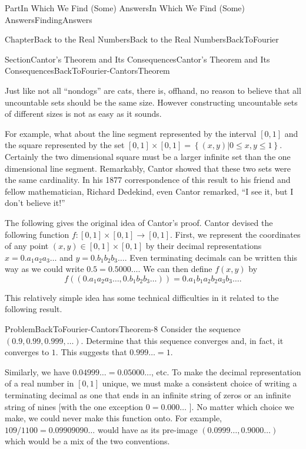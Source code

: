 \documentclass[oneside,10pt,]{book}
\numberwithin{equation}{part}
\begin{document}
\begin{partptx}{Part}{In Which We Find (Some) Answers}{}{In Which We Find (Some) Answers}{}{}{FindingAnswers}
\begin{chapterptx}{Chapter}{Back to the Real Numbers}{}{Back to the Real Numbers}{}{}{BackToFourier}
\begin{sectionptx}{Section}{Cantor's Theorem and Its Consequences}{}{Cantor's Theorem and Its Consequences}{}{}{BackToFourier-CantorsTheorem}
\par
Just like not all ``non\textendash{}dogs'' are cats, there is, offhand, no reason to believe that all uncountable sets should be the same size.  However constructing uncountable sets of different sizes is not as easy as it sounds.%
\par
{} For example, what about the line segment represented by the interval \([0,1]\) and the square represented by the set \([0,1]\times[0,1]=\left\{(x,y)|0\leq x,y\leq 1\right\}\). Certainly the two dimensional square must be a larger infinite set than the one dimensional line segment.  Remarkably, Cantor showed that these two sets were the same cardinality.  In his 1877 correspondence of this result to his friend and fellow mathematician, Richard Dedekind, even Cantor remarked, ``I see it, but I don't believe it!''%
\par
The following gives the original idea of Cantor's proof.  Cantor devised the following function \(f:[0,1]\times[0,1]\rightarrow
[0,1]\).  First, we represent the coordinates of any point \((x,y)\in [0,1]\times[0,1]\) by their decimal representations \(x=0.a_1 a_2 a_3\ldots\) and \(y=0.b_1 b_2
b_3\ldots\).  Even terminating decimals can be written this way as we could write \(0.5=0.5000\ldots\).  We can then define \(f(x,y)\) by%
\begin{equation*}
f((0.a_1 a_2 a_3\ldots ,0.b_1 b_2
b_3\ldots))=0.a_1 b_1 a_2 b_2 a_3 b_3\ldots \text{.}
\end{equation*}
%
\par
This relatively simple idea has some technical difficulties in it related to the following result.%
\begin{problem}{Problem}{}{BackToFourier-CantorsTheorem-8}%
Consider the sequence \((0.9,0.99,0.999,\ldots)\). Determine that this sequence converges and, in fact, it converges to \(1\).  This suggests that \(0.999\ldots=1\).%
\end{problem}
Similarly, we have \(0.04999\ldots=0.05000\ldots\), etc.  To make the decimal representation of a real number in \([0,1]\) unique, we must make a consistent choice of writing a terminating decimal as one that ends in an infinite string of zeros or an infinite string of nines [with the one exception \(0=0.000\ldots\) ]. No matter which choice we make, we could never make this function onto.  For example, \(109/1100=0.09909090\ldots\) would have as its pre-image \((0.0999\ldots,0.9000\ldots)\) which would be a mix of the two conventions.%

\end{sectionptx}
\end{chapterptx}
\end{partptx}
\end{document}
